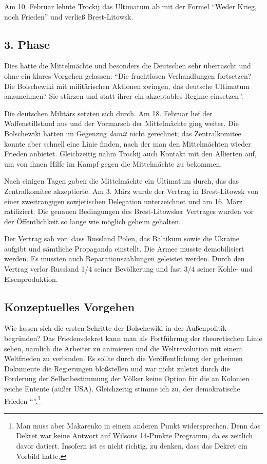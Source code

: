 \documentclass{../../sem_paper}
\begin{document}
Am 10. Februar lehnte Trockij das Ultimatum ab mit der Formel "`Weder Krieg, noch Frieden"' und verließ Brest-Litowsk.

\subsection{3. Phase}
Dies hatte die Mittelmächte und besonders die Deutschen sehr überrascht und ohne ein klares Vorgehen gelassen: "`Die fruchtlosen Verhandlungen fortsetzen? Die Bolschewiki mit militärischen Aktionen zwingen, das deutsche Ultimatum anzunehmen? Sie stürzen und statt ihrer ein akzeptables Regime einsetzen"'\autocite[416]{pipes1992}.

Die deutschen Militärs setzten sich durch. Am 18. Februar lief der Waffenstillstand aus und der Vormarsch der Mittelmächte ging weiter. Die Bolschewiki hatten im Gegenzug \textit{damit} nicht gerechnet; das Zentralkomitee konnte aber schnell eine Linie finden, nach der man den Mittelmächten wieder Frieden anbietet. Gleichzeitig nahm Trockij auch Kontakt mit den Allierten auf, um von ihnen Hilfe im Kampf gegen die Mittelmächte zu bekommen.

Nach einigen Tagen gaben die Mittelmächte ein Ultimatum durch, das das Zentralkomitee akzeptierte. Am 3. März wurde der Vertrag in Brest-Litowsk von einer zweitrangigen sowjetischen Delegation unterzeichnet und am 16. März ratifiziert. Die genauen Bedingungen des Brest-Litowsker Vertrages wurden vor der Öffentlichkeit so lange wie möglich geheim gehalten.

Der Vertrag sah vor, dass Russland Polen, das Baltikum sowie die Ukraine aufgibt und sämtliche Propaganda einstellt. Die Armee musste demobilisiert werden. Es mussten auch Reparationszahlungen geleistet werden. Durch den Vertrag verlor Russland 1/4 seiner Bevölkerung und fast 3/4 seiner Kohle- und Eisenproduktion\autocite[89]{rauch1990}.


\subsection{Konzeptuelles Vorgehen}
Wie lassen sich die ersten Schritte der Bolschewiki in der Außenpolitik begründen? Das Friedensdekret kann man als Fortführung der theoretischen Linie sehen, nämlich die Arbeiter zu animieren und die Weltrevolution mit einem Weltfrieden zu verbinden. Es sollte durch die Veröffentlichung der geheimen Dokumente die Regierungen bloßstellen und war nicht zuletzt durch die Forderung der Selbstbestimmung der Völker keine Option für die an Kolonien reiche Entente (außer USA). Gleichzeitig stimme ich zu, der demokratische Frieden "`"'\autocite{maka2010}.\footnote{Man muss aber Makarenko in einem anderen Punkt widersprechen. Denn das Dekret war keine Antwort auf Wilsons 14-Punkte Programm, da es zeitlich davor datiert. Insofern ist es nicht richtig, zu denken, dass das Dekret ein Vorbild hatte.}
\end{document}

